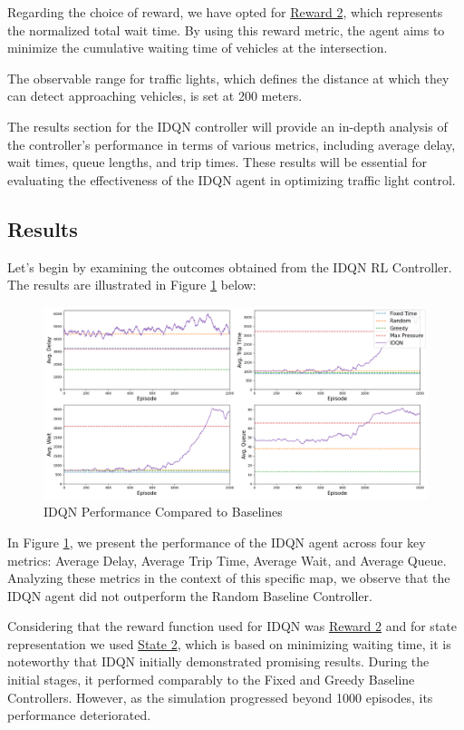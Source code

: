 Regarding the choice of reward, we have opted for \hyperref[subsec:reward-2]{Reward 2}, which represents the normalized total wait time. By using this reward metric, the agent aims to minimize the cumulative waiting time of vehicles at the intersection.

The observable range for traffic lights, which defines the distance at which they can detect approaching vehicles, is set at 200 meters.

The results section for the IDQN controller will provide an in-depth analysis of the controller's performance in terms of various metrics, including average delay, wait times, queue lengths, and trip times. These results will be essential for evaluating the effectiveness of the IDQN agent in optimizing traffic light control.

\subsection{Results}
Let's begin by examining the outcomes obtained from the IDQN RL Controller. The results are illustrated in Figure \ref{fig:idqn_results} below:

\begin{figure}[h]
    \centering
    \includegraphics[width=1\linewidth]{images/experiments/IDQN.png}
    \caption{IDQN Performance Compared to Baselines}
    \label{fig:idqn_results}
\end{figure}

In Figure \ref{fig:idqn_results}, we present the performance of the IDQN agent across four key metrics: Average Delay, Average Trip Time, Average Wait, and Average Queue. Analyzing these metrics in the context of this specific map, we observe that the IDQN agent did not outperform the Random Baseline Controller.

Considering that the reward function used for IDQN was \hyperref[subsec:reward-2]{Reward 2} and for state representation we used \hyperref[subsec:state-2]{State 2}, which is based on minimizing waiting time, it is noteworthy that IDQN initially demonstrated promising results. During the initial stages, it performed comparably to the Fixed and Greedy Baseline Controllers. However, as the simulation progressed beyond 1000 episodes, its performance deteriorated.

